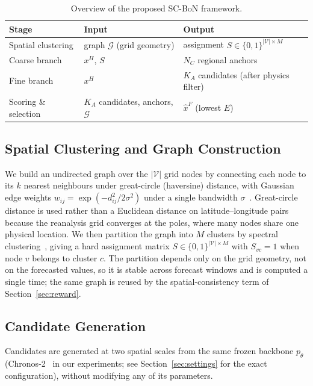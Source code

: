 \documentclass[preprint,12pt]{elsarticle}
\begin{document}
\begin{table}[H]
\centering
\caption{Overview of the proposed SC-BoN framework.}
\begin{tabular}{p{2.6cm}p{4.3cm}p{4.3cm}}
\toprule
\textbf{Stage} & \textbf{Input} & \textbf{Output} \\
\midrule
Spatial clustering & graph $\mathcal{G}$ (grid geometry) & assignment $S \in \{0,1\}^{|\mathcal{V}| \times M}$ \\
Coarse branch & $x^H$, $S$ & $N_C$ regional anchors \\
Fine branch & $x^H$ & $K_A$ candidates (after physics filter) \\
Scoring \& selection & $K_A$ candidates, anchors, $\mathcal{G}$ & $\hat{x}^F$ (lowest $E$) \\
\bottomrule
\end{tabular}
\label{tab:overview}
\end{table}

\subsection{Spatial Clustering and Graph Construction}
\label{sec:clustering}

We build an undirected graph over the $|\mathcal{V}|$ grid nodes by connecting each node to its $k$ nearest neighbours under great-circle (haversine) distance, with Gaussian edge weights $w_{ij}=\exp(-d_{ij}^2/2\sigma^2)$ under a single bandwidth $\sigma$~\citep{vonluxburg2007tutorial}. Great-circle distance is used rather than a Euclidean distance on latitude--longitude pairs because the reanalysis grid converges at the poles, where many nodes share one physical location. We then partition the graph into $M$ clusters by spectral clustering~\citep{ng2002spectral}, giving a hard assignment matrix $S\in\{0,1\}^{|\mathcal{V}|\times M}$ with $S_{vc}=1$ when node $v$ belongs to cluster $c$. The partition depends only on the grid geometry, not on the forecasted values, so it is stable across forecast windows and is computed a single time; the same graph is reused by the spatial-consistency term of Section~\ref{sec:reward}.

\subsection{Candidate Generation}
\label{sec:generation}

Candidates are generated at two spatial scales from the same frozen backbone $p_\theta$ (Chronos-2~\citep{ansari2025chronos2} in our experiments; see Section~\ref{sec:settings} for the exact configuration), without modifying any of its parameters.
\end{document}
